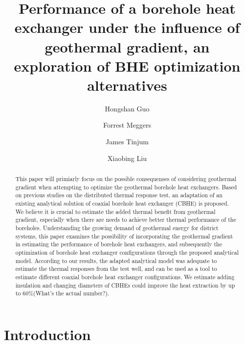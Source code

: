 \documentclass[3p]{elsarticle/elsarticle}
\begin{document}
\begin{frontmatter}
\title{Performance of a borehole heat exchanger under the influence of geothermal gradient, an exploration of BHE optimization alternatives}
\author[Group1]{Hongshan Guo}



\author[Group2]{Forrest Meggers}


\author[Group3]{James Tinjum}
\author[Group4]{Xiaobing Liu}

\address[Group1]{Andlinger Center for Energy and the Environment, Princeton University, Princeton, United States}
\address[Group2]{School of Architecture, Princeton University, Princeton, United States}



\begin{abstract}
This paper will primiarly focus on the possible consequenses of considering geothermal gradient when attempting to optimize the geothermal borehole heat exchangers. Based on previous studies on the distributed thermal response test, an adaptation of an existing analytical solution of coaxial borehole heat exchanger (CBHE) is proposed. We believe it is crucial to estimate the added thermal benefit from geothermal gradient, especially when there are needs to achieve better thermal performance of the boreholes. Understanding the growing demand of geothermal energy for district systems, this paper examines the possibility of incorporating the geothermal gradient in estimating the performance of borehole heat exchangers, and subsequently the optimization of borehole heat exchanger configurations through the proposed analytical model. According to our results, the adapted analytical model was adequate to estimate the thermal responses from the test well, and can be used as a tool to estimate different coaxial borehole heat exchanger configurations. We estimate adding insulation and changing diameters of CBHEs could improve the heat extraction by up to 60\%(What's the actual number?).\end{abstract}

\begin{keyword}

\end{keyword}

\end{frontmatter}

\section{Introduction}

\end{document}
